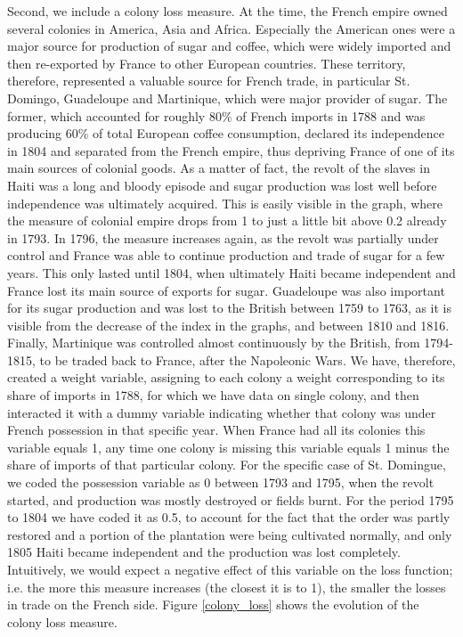 \documentclass[12pt,a4paper,notitlepage,english]{article}
\begin{document}
Second, we include a colony loss measure. At the time, the French empire owned several colonies in America, Asia and Africa. Especially the American ones were a major source for production of sugar and coffee, which were widely imported and then re-exported by France to other European countries. These territory, therefore, represented a valuable source for French trade, in particular St. Domingo, Guadeloupe and Martinique, which were major provider of sugar. The former, which accounted for roughly 80\% of French imports in 1788 and was producing 60\% of total European coffee consumption, declared its independence in 1804 and separated from the French empire, thus depriving France of one of its main sources of colonial goods. As a matter of fact, the revolt of the slaves in Haiti was a long and bloody episode and sugar production was lost well before independence was ultimately acquired. This is easily visible in the graph, where the measure of colonial empire drops from 1 to just a little bit above 0.2 already in 1793. In 1796, the measure increases again, as the revolt was partially under control and France was able to continue production and trade of sugar for a few years. This only lasted until 1804, when ultimately Haiti became independent and France lost its main source of exports for sugar. Guadeloupe was also important for its sugar production and was lost to the British between 1759 to 1763, as it is visible from the decrease of the index in the graphs, and between 1810 and 1816. Finally, Martinique was controlled almost continuously by the British, from 1794-1815, to be traded back to France, after the Napoleonic Wars. We have, therefore, created a weight variable, assigning to each colony a weight corresponding to its share of imports in 1788, for which we have data on single colony, and then interacted it with a dummy variable indicating whether that colony was under French possession in that specific year. When France had all its colonies this variable equals 1, any time one colony is missing this variable equals 1 minus the share of imports of that particular colony. For the specific case of St. Domingue, we coded the possession variable as 0 between 1793 and 1795, when the revolt started, and production was mostly destroyed or fields burnt. For the period 1795 to 1804 we have coded it as 0.5, to account for the fact that the order was partly restored and a portion of the plantation were being cultivated normally, and only 1805 Haiti became independent and the production was lost completely. Intuitively, we would expect a negative effect of this variable on the loss function; i.e. the more this measure increases (the closest it is to 1), the smaller the losses in trade on the French side. Figure \ref{colony_loss} shows the evolution of the colony loss measure. 
\end{document}
